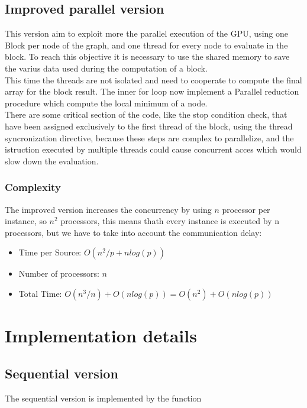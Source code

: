 \documentclass[
	a4paper, %
	12pt, %
]{class}
\begin{document}
\subsection{Improved parallel version}
This version aim to exploit more the parallel execution of the GPU, using one Block per node of the graph, and one thread for every node to evaluate in the block.
To reach this objective it is necessary to use the shared memory to save the varius data used during the computation of a block.\\

This time the threads are not isolated and need to cooperate to compute the final array for the block result.
The inner for loop now implement a Parallel reduction procedure which compute the local minimum of a node.\\

There are some critical section of the code, like the stop condition check, that have been assigned exclusively to the first thread of the block,
using the thread syncronization directive, because these steps are complex to parallelize, and the istruction executed by multiple threads could
cause concurrent acces which would slow down the evaluation.

\subsubsection{Complexity}
The improved version increases the concurrency by using $n$ processor per instance, so $n^2$ processors, this means thath every instance is executed
by n processors, but we have to take into account the communication delay:\\
\begin{itemize}
    \item Time per Source: $O(n^2/p + nlog(p))$
    \item Number of processors: $n$
    \item Total Time: $O(n^3 / n) + O(nlog(p)) = O(n^2) + O(nlog(p))$\\
\end{itemize}

\newpage
\section{Implementation details}

\subsection{Sequential version}
The sequential version is implemented by the function
\end{document}
